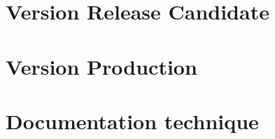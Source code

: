 \documentclass{tstextbook}
\begin{document}
\chapter{Version Release Candidate}


\chapter{Version Production}




\chapter{Documentation technique}


\end{document}
